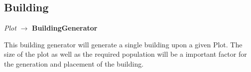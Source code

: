 \subsection{Building}
\begin{center}    
    \textit{Plot} $\rightarrow$ \textbf{BuildingGenerator}
\end{center}

This building generator will generate a single building upon a given Plot. 
The size of the plot as well as the required population will be a important factor for the generation and placement of the building. 
